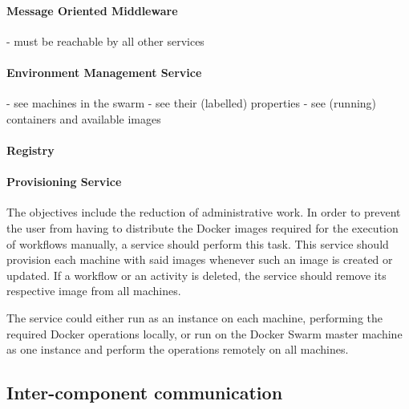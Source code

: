     \paragraph{Message Oriented Middleware} %
      \label{par:message_oriented_middleware}
      - must be reachable by all other services

    \paragraph{Environment Management Service} %
      \label{par:environment_management_service}
        - see machines in the swarm
        - see their (labelled) properties
        - see (running) containers and available images

    \paragraph{Registry} %
    \label{par:registry}


    \paragraph{Provisioning Service} %
      \label{par:provisioning_service}
        The objectives include the reduction of administrative work. In order to prevent the user from having to distribute the Docker images required for the execution of workflows manually, a service should perform this task. This service should provision each machine with said images whenever such an image is created or updated. If a workflow or an activity is deleted, the service should remove its respective image from all machines.

        The service could either run as an instance on each machine, performing the required Docker operations locally, or run on the Docker Swarm master machine as one instance and perform the operations remotely on all machines.

\subsection{Inter-component communication} %
\label{sub:inter_component_communication}

